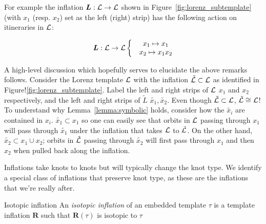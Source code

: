 \documentclass[paper.tex]{subfiles}
\begin{document}
For example the inflation $\bm{L} : \mathcal{L} \to \mathcal{L}$ shown in Figure~\ref{fig:lorenz_subtemplate} (with $x_1$ (resp. $x_2$) set as the left (right) strip) has the following action on itineraries in $\mathcal{L}$:

\begin{equation}
  \bm{L} : \mathcal{L} \to \mathcal{L} \left\{ \begin{matrix} & x_1 \mapsto x_1 \\ & x_2 \mapsto x_1 x_2 \end{matrix}\right.
\end{equation}

A high-level discussion which hopefully serves to elucidate the above remarks follows. Consider the Lorenz template $\mathcal{L}$ with the inflation $\tilde{\mathcal{L}} \subset \mathcal{L}$ as identified in Figure!\ref{fig:lorenz_subtemplate}.
Label the left and right strips of $\mathcal{L}$ $x_1$ and $x_2$ respectively, and the left and right strips of $\tilde{L}$ $\tilde{x_1}, \tilde{x_2}$.
Even though $\tilde{\mathcal{L}} \subset \mathcal{L}$, $\tilde{\mathcal{L}} \cong \mathcal{L}$! To understand why Lemma~\ref{lemma:symbolic} holds, consider how the $\tilde{x_i}$ are contained in $x_i$. $\tilde{x_1} \subset x_1$ so one can easily see that
orbits in $\mathcal{L}$ passing through $x_1$ will pass through $\tilde{x_1}$ under the inflation that takes $\mathcal{L}$ to $\tilde{\mathcal{L}}$. On the other hand, $\tilde{x_2} \subset x_1 \cup x_2$; orbits in $\tilde{\mathcal{L}}$ passing through
$\tilde{x_2}$ will first pass through $x_1$ and then $x_2$ when pulled back along the inflation.

Inflations take knots to knots but will typically change the knot type. We identify a special class of inflations that preserve knot type, as these are the inflations that we're really after.


\begin{definition}{Isotopic inflation}
  An \emph{isotopic inflation} of an embedded template $\tau$ is a template inflation $\bm{R}$ such that $\bm{R}(\tau)$ is isotopic to $\tau$
\end{definition}
\end{document}
